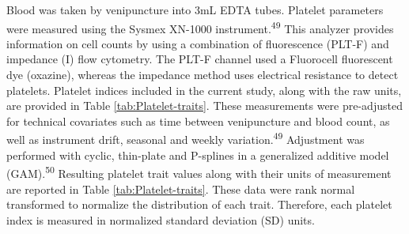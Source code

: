 \documentclass[11pt,twoside]{bristolthesis}
\begin{document}
Blood was taken by venipuncture into 3mL EDTA tubes. Platelet parameters were measured using the Sysmex XN-1000 instrument.\textsuperscript{49} This analyzer provides information on cell counts by using a combination of fluorescence (PLT-F) and impedance (I) flow cytometry. The PLT-F channel used a Fluorocell fluorescent dye (oxazine), whereas the impedance method uses electrical resistance to detect platelets. Platelet indices included in the current study, along with the raw units, are provided in Table \ref{tab:Platelet-traits}. These measurements were pre-adjusted for technical covariates such as time between venipuncture and blood count, as well as instrument drift, seasonal and weekly variation.\textsuperscript{49} Adjustment was performed with cyclic, thin-plate and P-splines in a generalized additive model (GAM).\textsuperscript{50} Resulting platelet trait values along with their units of measurement are reported in Table \ref{tab:Platelet-traits}. These data were rank normal transformed to normalize the distribution of each trait. Therefore, each platelet index is measured in normalized standard deviation (SD) units.
\end{document}
